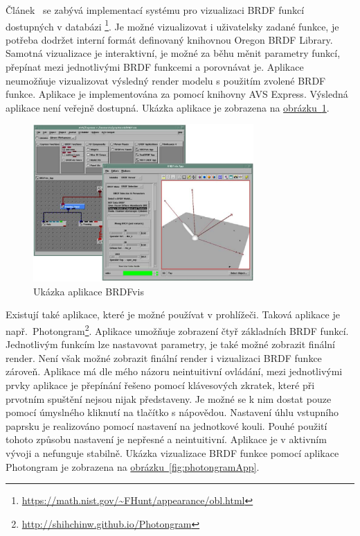 \documentclass[czech,master]{diploma}
\newcommand{\appH}{6cm}
\begin{document}
Článek~\cite{brdfviz} se zabývá implementací systému pro vizualizaci BRDF funkcí dostupných v databázi \footnote{\url{https://math.nist.gov/~FHunt/appearance/obl.html}}. Je možné vizualizovat i uživatelsky zadané funkce, je potřeba dodržet interní formát definovaný knihovnou Oregon BRDF Library. Samotná vizualizace je interaktivní, je možné za běhu měnit parametry funkcí, přepínat mezi jednotlivými BRDF funkcemi a porovnávat je. Aplikace neumožňuje vizualizovat výsledný render modelu s použitím zvolené BRDF funkce. Aplikace je implementována za pomocí knihovny AVS Express. Výsledná aplikace není veřejně dostupná. Ukázka aplikace je zobrazena na \hyperref[fig:walkerBrdfApp]{obrázku~\ref{fig:walkerBrdfApp}}.\par

\begin{figure}[ht]
  \centering
  \includegraphics[height=\appH]{Figures/brdfvisWalker.png}
  \caption[Ukázka aplikace BRDFvis]{Ukázka aplikace BRDFvis~\cite{brdfviz}}%
  \label{fig:walkerBrdfApp}%
\end{figure}

Existují také aplikace, které je možné používat v prohlížeči. Taková aplikace je např.\ Photongram\footnote{\url{http://shihchinw.github.io/Photongram}}. Aplikace umožňuje zobrazení čtyř základních BRDF funkcí. Jednotlivým funkcím lze nastavovat parametry, je také možné zobrazit finální render. Není však možné zobrazit finální render i vizualizaci BRDF funkce zároveň. Aplikace má dle mého názoru neintuitivní ovládání, mezi jednotlivými prvky aplikace je přepínání řešeno pomocí klávesových zkratek, které při prvotním spuštění nejsou nijak představeny. Je možné se k nim dostat pouze pomocí úmyslného kliknutí na tlačítko s nápovědou. Nastavení úhlu vstupního paprsku je realizováno pomocí nastavení na jednotkové kouli. Pouhé použití tohoto způsobu nastavení je nepřesné a neintuitivní. Aplikace je v aktivním vývoji a nefunguje stabilně. Ukázka vizualizace BRDF funkce pomocí aplikace Photongram je zobrazena na \hyperref[fig:photongramApp]{obrázku~\ref{fig:photongramApp}}.\par
\end{document}
